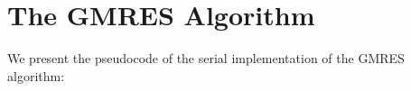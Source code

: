 \section{The GMRES Algorithm}

We present the pseudocode of the serial implementation of the GMRES algorithm:

\begin{algorithm}[H]
    \begin{algorithmic}
        \EndProcedure
    \end{algorithmic}
\end{algorithm}
